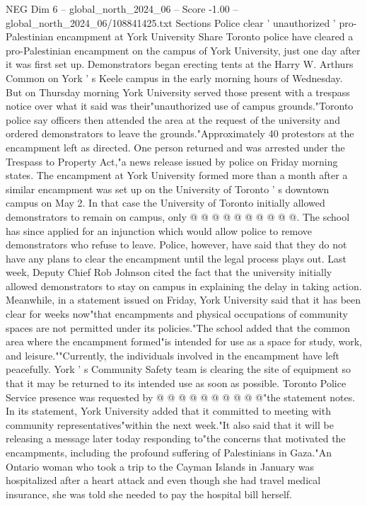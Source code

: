 \begin{textsample}{NEG Dim 6 – global\_north\_2024\_06 – Score -1.00 – global\_north\_2024\_06/108841425.txt}  \label{ex:f6_neg_306}
Sections Police clear ' unauthorized ' pro-Palestinian encampment at York University Share Toronto police have cleared a pro-Palestinian encampment on the campus of York University, just one day after it was first set up.
Demonstrators began erecting tents at the Harry W.
Arthurs Common on York ' s Keele campus in the early morning hours of Wednesday.
But on Thursday morning York University served those present with a trespass notice over what it said was their"unauthorized use of campus grounds."Toronto police say officers then attended the area at the request of the university and ordered demonstrators to leave the grounds."Approximately 40 protestors at the encampment left as directed.
One person returned and was arrested under the Trespass to Property Act,"a news release issued by police on Friday morning states.
The encampment at York University formed more than a month after a similar encampment was set up on the University of Toronto ' s downtown campus on May 2.
In that case the University of Toronto initially allowed demonstrators to remain on campus, only @ @ @ @ @ @ @ @ @ @.
The school has since applied for an injunction which would allow police to remove demonstrators who refuse to leave.
Police, however, have said that they do not have any plans to clear the encampment until the legal process plays out.
Last week, Deputy Chief Rob Johnson cited the fact that the university initially allowed demonstrators to stay on campus in explaining the delay in taking action.
Meanwhile, in a statement issued on Friday, York University said that it has been clear for weeks now"that encampments and physical occupations of community spaces are not permitted under its policies."The school added that the common area where the encampment formed"is intended for use as a space for study, work, and leisure.""Currently, the individuals involved in the encampment have left peacefully.
York ' s Community Safety team is clearing the site of equipment so that it may be returned to its intended use as soon as possible.
Toronto Police Service presence was requested by @ @ @ @ @ @ @ @ @ @"the statement notes.
In its statement, York University added that it committed to meeting with community representatives"within the next week."It also said that it will be releasing a message later today responding to"the concerns that motivated the encampments, including the profound suffering of Palestinians in Gaza."An Ontario woman who took a trip to the Cayman Islands in January was hospitalized after a heart attack and even though she had travel medical insurance, she was told she needed to pay the hospital bill herself.

\end{textsample}
